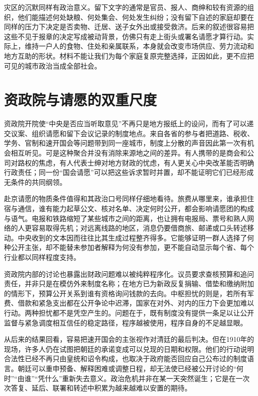 灾区的沉默同样有政治意义。留下文字的通常是官员、报人、商绅和较有资源的组织，他们能描述何处缺粮、何处集会、何处发生纠纷；没有留下自述的家庭却要在同样的压力下决定是否卖物、迁居、送子女外出或接受救济。后来的叙述很容易把这些不见于报章的决定写成被动背景，仿佛只有走上街头或署名请愿才算行动。实际上，维持一户人的食物、住处和亲属联系，本身就会改变市场供应、劳力流动和地方互助的形状。材料不能让我们为每个家庭复原完整选择，正因如此，更不应把可见的城市政治当成全部社会。

\section{资政院与请愿的双重尺度}

资政院开院使“中央是否应当听取意见”不再只是地方报纸上的设问，而有了可以递交议案、组织请愿和留下会议记录的制度地点。来自各省的参与者把道路、税收、学务、官制和速开国会等问题带到同一座城市，制度上分散的声音因此第一次有机会相互听见。可是这种聚合并没有消除来源地之间的差异。有人携带的是商会和公司对路权的焦虑，有人代表士绅对地方财政的忧虑，有人更关心中央改革能否明确行政责任；同一份“国会请愿”可以把这些诉求暂时并置，却不能证明它们已经形成无条件的共同纲领。

赴京请愿的物质条件值得和其政治口号同样仔细地看待。旅费从哪里来，谁承担住宿与通信，谁有能力起草公文、核对名单、决定何时公开，都会影响请愿团的构成与语气。电报和铁路缩短了某些城市之间的距离，也让拥有电报局、票号和熟人网络的人更容易取得先机；对远离线路的地区，消息仍要借商旅、邮递或口头转述移动。中央收到的文本因而往往比其生成过程整齐得多。它能够证明一群人选择了何种公开主张，却不能替未参加者解释为何没有参加，更不能自动显示每个省、每个行业都以同样程度支持。

资政院内部的讨论也暴露出财政问题难以被纯粹程序化。议员要求查核预算和追问责任，并非只是在模仿外来制度名称；在地方已为新政反复捐输、借垫和缴纳附加的情形下，预算公开关系到谁有资格询问钱款的去向。中枢担忧的则是，若所有军费、借款和紧急支出都在公开争论中迟滞，国家在对外、对内的压力下会更加难以行动。两种担忧都不是凭空产生的。问题在于，既有制度没有提供一条足以让公开监督与紧急调度相互信任的稳定路径，程序越被使用，程序自身的不足越显眼。

从后来的结果回看，容易把速开国会的主张视作对清廷的最后判决。但在1910年的现场，许多人仍在试图把朝廷的承诺变成可以兑现的日期和权限。他们的行动说明合法性已经不再只由皇统和诏令构成，也取决于政府能否回应自己公布过的制度语言。朝廷可以重申预备、解释困难或调整日程，却无法使已经被公开讨论的“何时”“由谁”“凭什么”重新失去意义。政治危机并非在某一天突然诞生；它是在一次次答复、延后、联署和转述中积累为越来越难以安置的期待。

